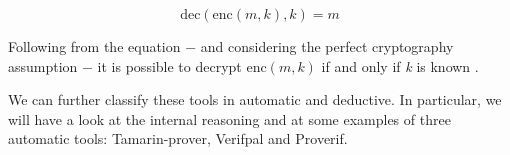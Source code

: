 \begin{equation}
\mbox{dec}\left(\mbox{enc}\left(m, k\right), k\right) = m
\end{equation}

Following from the equation $-$ and considering the perfect cryptography assumption $-$ it is possible to decrypt $\mbox{enc}\left(m, k\right)$ if and only if \textit{k} is known \cite{SymbolicComputationalBlanchet}.

We can further classify these tools in automatic and deductive. In particular, we will have a look at the internal reasoning and at some examples of three automatic tools: Tamarin-prover, Verifpal and Proverif.